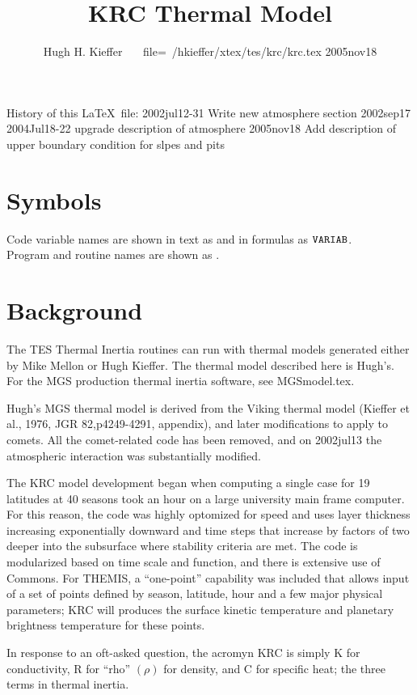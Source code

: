 \documentclass{article}
\title{KRC Thermal Model}
\author{Hugh H. Kieffer \ \ \ file=~/hkieffer/xtex/tes/krc/krc.tex 2005nov18}
\begin{document}
\maketitle

History of this \LaTeX ~file:
\qi 2002jul12-31  Write new atmosphere section
\qi 2002sep17
\qi 2004Jul18-22 upgrade description of atmosphere
\qi 2005nov18 Add description of upper boundary condition for slpes and pits

\section{Symbols} %
Code variable names are shown in text as  
and in formulas as $\mathtt{VARIAB}$. 
\\ Program and routine names are shown as . 

\section{Background} %

The TES Thermal Inertia routines can run with thermal models generated either by
Mike Mellon or Hugh Kieffer.  The thermal model described here is Hugh's. For
the MGS production thermal inertia software, see MGSmodel.tex.

Hugh's MGS thermal model is derived from the Viking thermal model
(Kieffer et al., 1976, JGR 82,p4249-4291, appendix), and later
modifications to apply to comets. All the comet-related code has been
removed, and on 2002jul13 the atmospheric interaction was substantially modified.

The KRC model development began when computing a single case for 19 latitudes at
40 seasons took an hour on a large university main frame computer. For this
reason, the code was highly optomized for speed and uses layer thickness
increasing exponentially downward and time steps that increase by factors of two
deeper into the subsurface where stability criteria are met. The code is
modularized based on time scale and function, and there is extensive use of
Commons. For THEMIS, a ``one-point'' capability was included that allows input
of a set of points defined by season, latitude, hour and a few major physical
parameters; KRC will produces the surface kinetic temperature and planetary
brightness temperature for these points.

In response to an oft-asked question, the acromyn KRC is simply K for
conductivity, R for ``rho'' $( \rho)$ for density, and C for specific heat; the
three terms in thermal inertia. 
\end{document}

